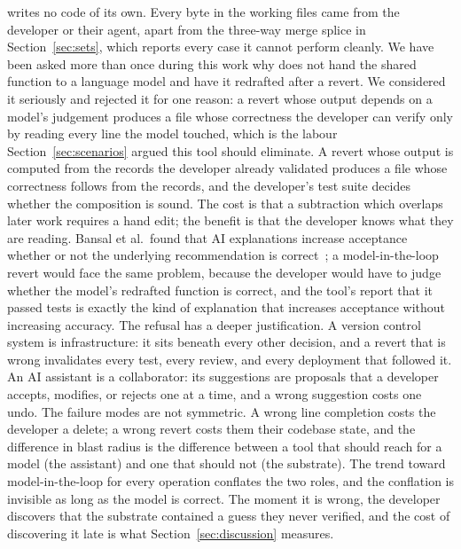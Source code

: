\sgt{} writes no code of its own. Every byte in the working files came from the
developer or their agent, apart from the three-way merge splice in
Section~\ref{sec:sets}, which reports every case it cannot perform cleanly. We have
been asked more than once during this work why \sgt{} does not hand the shared
function to a language model and have it redrafted after a revert. We considered it
seriously and rejected it for one reason: a revert whose output depends on a
model's judgement produces a file whose correctness the developer can verify only
by reading every line the model touched, which is the labour Section~\ref{sec:scenarios}
argued this tool should eliminate. A revert whose output is computed from the
records the developer already validated produces a file whose correctness follows
from the records, and the developer's test suite decides whether the composition
is sound. The cost is that a subtraction which overlaps later work requires a hand
edit; the benefit is that the developer knows what they are reading. Bansal et
al.\ found that AI explanations increase acceptance whether or not the underlying
recommendation is correct~\cite{bansal2021}; a model-in-the-loop revert would
face the same problem, because the developer would have to judge whether the
model's redrafted function is correct, and the tool's report that it passed tests
is exactly the kind of explanation that increases acceptance without increasing
accuracy. The refusal has a deeper justification. A version control system is
infrastructure: it sits beneath every other decision, and a revert that is wrong
invalidates every test, every review, and every deployment that followed it. An
AI assistant is a collaborator: its suggestions are proposals that a developer
accepts, modifies, or rejects one at a time, and a wrong suggestion costs one
undo. The failure modes are not symmetric. A wrong line completion costs the
developer a delete; a wrong revert costs them their codebase state, and the
difference in blast radius is the difference between a tool that should reach for
a model (the assistant) and one that should not (the substrate). The trend toward
model-in-the-loop for every operation conflates the two roles, and the
conflation is invisible as long as the model is correct. The moment it is wrong,
the developer discovers that the substrate contained a guess they never verified,
and the cost of discovering it late is what Section~\ref{sec:discussion}
measures.

